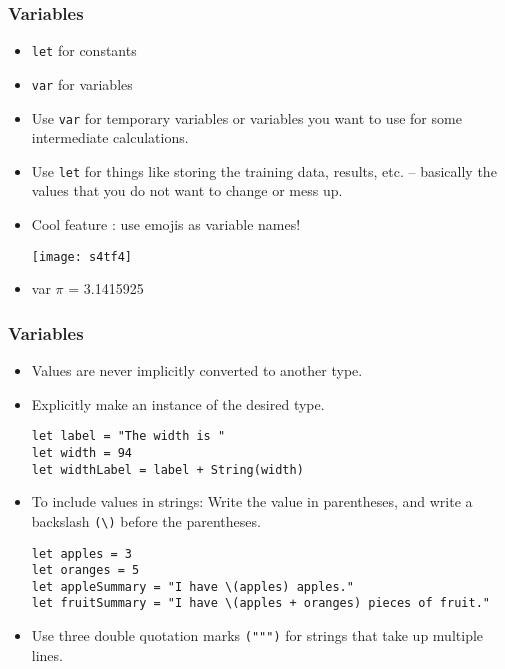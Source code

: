 \begin{frame}[fragile] \frametitle{Variables}

\begin{itemize}
\item \lstinline|let| for constants
\item \lstinline|var| for variables
\item Use \lstinline|var| for temporary variables or variables you want to use for some intermediate calculations.
\item Use \lstinline|let| for things like storing the training data, results, etc. – basically the values that you do not want to change or mess up.
\item Cool feature : use emojis as variable names!

\begin{center}
\texttt{[image: s4tf4]}
\end{center}

\item var $\pi$ = 3.1415925

\end{itemize}

\end{frame}

\begin{frame}[fragile] \frametitle{Variables}

\begin{itemize}
\item Values are never implicitly converted to another type.
\item Explicitly make an instance of the desired type.
\begin{lstlisting}
let label = "The width is "
let width = 94
let widthLabel = label + String(width)
\end{lstlisting}
\item To include values in strings: Write the value in parentheses, and write a backslash \lstinline|(\)| before the parentheses.
\begin{lstlisting}
let apples = 3
let oranges = 5
let appleSummary = "I have \(apples) apples."
let fruitSummary = "I have \(apples + oranges) pieces of fruit."
\end{lstlisting}
\item Use three double quotation marks \lstinline|(""")| for strings that take up multiple lines.
\end{itemize}


\end{frame}


